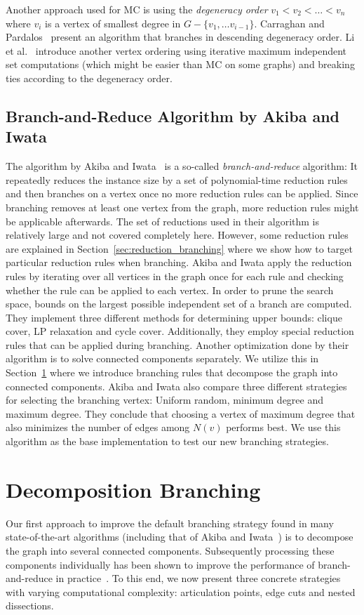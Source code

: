 \documentclass[a4paper,UKenglish,cleveref, autoref, thm-restate]{lipics-v2021}
\begin{document}
Another approach used for MC is using the \emph{degeneracy order} $v_1 < v_2 <
\dots < v_n$ where $v_i$ is a vertex of smallest degree in $G - \{v_1, \dots
v_{i-1}\}$. Carraghan and Pardalos~\cite{CarraghanPardalos} present an algorithm
that branches in descending degeneracy order. Li et al.~\cite{LiFangXu}
introduce another vertex ordering using iterative maximum independent set
computations (which might be easier than MC on some graphs) and breaking ties
according to the degeneracy order.

\subsection{Branch-and-Reduce Algorithm by Akiba and Iwata}

The algorithm by Akiba and Iwata~\cite{AkibaIwata} is a so-called
\emph{branch-and-reduce} algorithm: It repeatedly reduces the instance size by a
set of polynomial-time reduction rules and then branches on a vertex once no
more reduction rules can be applied. Since branching removes at least one vertex
from the graph, more reduction rules might be applicable afterwards. The
set of reductions used in their algorithm is relatively large and not covered
completely here. However, some reduction rules are explained in
Section~\ref{sec:reduction_branching} where we show how to target particular reduction
rules when branching. Akiba and Iwata apply the reduction rules by iterating over all
vertices in the graph once for each rule and checking whether the rule
can be applied to each vertex. In order to prune the search space, bounds on the largest
possible independent set of a branch are computed. They implement three different
methods for determining upper bounds: clique cover, LP relaxation and cycle
cover. Additionally, they employ special reduction rules that can be applied
during branching. Another optimization done by their algorithm is to solve
connected components separately. We utilize this in
Section~\ref{sec:decomposition_branching} where we introduce branching rules
that decompose the graph into connected components. Akiba and Iwata also
compare three different strategies for
selecting the branching vertex: Uniform random, minimum degree and maximum
degree. They conclude that choosing a vertex of maximum degree that also
minimizes the number of edges among $N(v)$ performs best. We use this algorithm
as the base implementation to test our new branching strategies.

\section{Decomposition Branching}\label{sec:decomposition_branching}
Our first approach to improve the default branching strategy found in many state-of-the-art algorithms (including that of Akiba and Iwata~\cite{AkibaIwata}) is to decompose the graph into several connected components.
Subsequently processing these components individually has been shown to improve the performance of branch-and-reduce in practice~\cite{alsahafy2020computing}.
To this end, we now present three concrete strategies with varying computational
complexity: articulation points, edge cuts and nested dissections.
\end{document}
